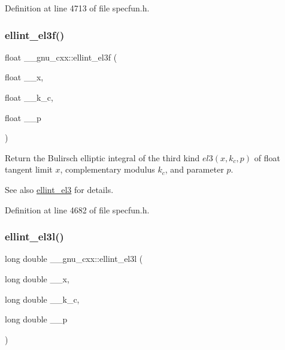 Definition at line 4713 of file specfun.\+h.

\mbox{\label{group__gnu__math__spec__func_ga66131a8ecc14b5228a73a01121f60a35}} 
\subsubsection{\texorpdfstring{ellint\+\_\+el3f()}{ellint\_el3f()}}
{\footnotesize\ttfamily float \+\_\+\+\_\+gnu\+\_\+cxx\+::ellint\+\_\+el3f (\begin{DoxyParamCaption}\item[{float}]{\+\_\+\+\_\+x,  }\item[{float}]{\+\_\+\+\_\+k\+\_\+c,  }\item[{float}]{\+\_\+\+\_\+p }\end{DoxyParamCaption})\hspace{0.3cm}{\ttfamily [inline]}}

Return the Bulirsch elliptic integral of the third kind $ el3(x,k_c,p) $ of {\ttfamily float} tangent limit $ x $, complementary modulus $ k_c $, and parameter $ p $.

\begin{DoxySeeAlso}{See also}
\hyperlink{group__gnu__math__spec__func_gaac07922e08fdf46cd509ff0cfa9ea1f0}{ellint\+\_\+el3} for details. 
\end{DoxySeeAlso}


Definition at line 4682 of file specfun.\+h.

\mbox{\label{group__gnu__math__spec__func_ga0d90e66f799a2ebe4bec43eef0d53355}} 
\subsubsection{\texorpdfstring{ellint\+\_\+el3l()}{ellint\_el3l()}}
{\footnotesize\ttfamily long double \+\_\+\+\_\+gnu\+\_\+cxx\+::ellint\+\_\+el3l (\begin{DoxyParamCaption}\item[{long double}]{\+\_\+\+\_\+x,  }\item[{long double}]{\+\_\+\+\_\+k\+\_\+c,  }\item[{long double}]{\+\_\+\+\_\+p }\end{DoxyParamCaption})\hspace{0.3cm}{\ttfamily [inline]}}

